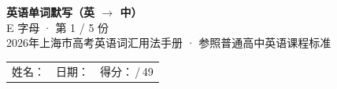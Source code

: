 \documentclass[10pt,a4paper]{article}
\begin{document}
\pagestyle{plain}

\begin{center}
{\LARGE\bfseries 英语单词默写（英 $\to$ 中）}\\[0.22em]
{\large E 字母 · 第 1 / 5 份}\\[0.18em]
{\small 2026年上海市高考英语词汇用法手册 · 参照普通高中英语课程标准}
\end{center}

\vspace{0.25em}
\noindent\begin{tabular}{@{}p{}@{}p{}@{}p{}@{}}
姓名：\underline{\hspace{2.0cm}} & 日期：\underline{\hspace{2.0cm}} & 得分：\underline{\hspace{1.3cm}}\,/\,49 \\
\end{tabular}

\vspace{0.3em}

\vspace{0.08em}
\end{document}
